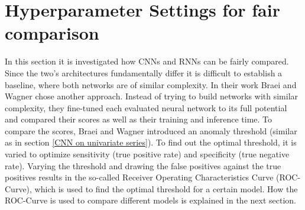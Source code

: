 %
%
%
%


\section{Hyperparameter Settings for fair comparison}
In this section it is investigated how CNNs and RNNs can be fairly compared. Since the two's architectures fundamentally differ it is difficult to establish a baseline, where both networks are of similar complexity. In their work Braei and Wagner \parencite*{Braei2020} chose another approach. Instead of trying to build networks with similar complexity, they fine-tuned each evaluated neural network to its full potential and compared their scores as well as their training and inference time. To compare the scores, Braei and Wagner introduced an anomaly threshold (similar as in section \ref{CNN on univariate series}). To find out the optimal threshold, it is varied to optimize sensitivity (true positive rate) and specificity (true negative rate). Varying the threshold and drawing the false positives against the true positives results in the so-called Receiver Operating Characteristics Curve (ROC-Curve), which is used to find the optimal threshold for a certain model. How the ROC-Curve is used to compare different models is explained in the next section.


